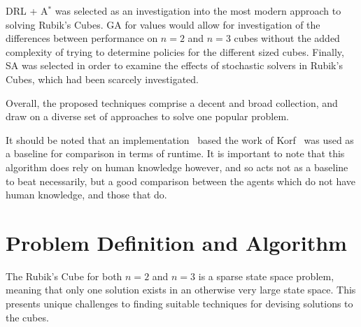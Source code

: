 \documentclass[UKenglish]{svproc}
\begin{document}
DRL + A$^{\ast}$ was selected as an investigation into the most modern approach to solving Rubik's Cubes. GA for values would allow for investigation of the differences between performance on $n=2$ and $n=3$ cubes without the added complexity of trying to determine policies for the different sized cubes. Finally, SA was selected in order to examine the effects of stochastic solvers in Rubik's Cubes, which had been scarcely investigated.

Overall, the proposed techniques comprise a decent and broad collection, and draw on a diverse set of approaches to solve one popular problem.

It should be noted that an implementation~\cite{Shoukat2019} based the work of Korf~\cite{KORF198597} was used as a baseline for comparison in terms of runtime. It is important to note that this algorithm does rely on human knowledge however, and so acts not as a baseline to beat necessarily, but a good comparison between the agents which do not have human knowledge, and those that do.


\section{Problem Definition and Algorithm}
The Rubik's Cube for both $n=2$ and $n=3$ is a sparse state space problem, meaning that only one solution exists in an otherwise very large state space. This presents unique challenges to finding suitable techniques for devising solutions to the cubes.
\end{document}
